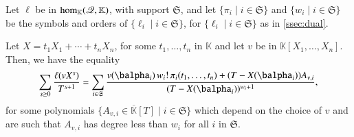 \documentclass[final,1p,times,authoryear]{elsarticle}
\newcommand{\lf}{X}
\newcommand{\residueI}{\mathscr{Q}}
\def\K{\mathbb{K}}
\def\K {\ensuremath{\mathbb{K}}}
\def\Kbar {{\ensuremath{\overline{\mathbb{K}}}}}
\begin{document}
\begin{lemma}\label{lemma:formula}
  Let $\ell$ be in ${\rm hom}_\K(\residueI,\K)$, with support $\mathfrak{S}$,
  and let $\{\pi_i \mid i \in \mathfrak{S}\}$ and $\{w_i \mid i \in
  \mathfrak{S}\}$ be the symbols and orders of $\{\ell_i \mid i \in \mathfrak{S}\}$,
  for $\{\ell_i \mid i \in \mathfrak{S}\}$ as in \cref{ssec:dual}.

  Let $\lf=t_1 X_1 + \cdots +t_n X_n$, for some $t_1,\dots,t_n$ in $\K$
  and let $v$ be in $\K[X_1,\dots,X_n]$. Then, we have the equality
  \begin{align}\label{eq:sumgenseries}
    \sum_{s \ge 0} \frac{\ell(v \lf^s)}{T^{s+1}} = \sum_{i \in \mathfrak{S}}
    \frac{ v(\balpha_i)\, w_i!\, \pi_{i}(t_1,\dots,t_n) +
    (T-\lf(\balpha_i))A_{v,i}} {(T-\lf(\balpha_i))^{w_{i}+1}},
  \end{align}
  for some polynomials $\{A_{v,i} \in \Kbar[T] \mid i \in \mathfrak{S}\}$ which
  depend on the choice of $v$ and are such that $A_{v,i}$ has degree less than
  $w_i$ for all $i$ in $\mathfrak{S}$.
\end{lemma}
\end{document}
